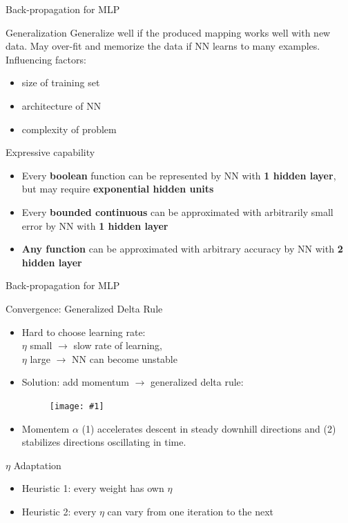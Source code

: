 \documentclass[9pt,t]{beamer}
\newcommand{\picEqHereWidth}[2] { %
    \begin{figure}[htp] 
        \centering
        \texttt{[image: \#1]}
    \end{figure}
}
\begin{document}
\begin{frame}{Back-propagation for MLP}
    \begin{alertblock}{Generalization}
        Generalize well if the produced mapping works well with new data. May over-fit and memorize the data if NN learns to many examples. Influencing factors:
        \begin{itemize}
            \item size of training set
            \item architecture of NN
            \item complexity of problem
        \end{itemize}
    \end{alertblock}
    \begin{alertblock}{Expressive capability}
        \begin{itemize}
            \item Every \textbf{boolean} function can be represented by NN with \textbf{1 hidden layer}, but may require \textbf{exponential hidden units}
            \item Every \textbf{bounded continuous} can be approximated with arbitrarily small error by NN with \textbf{1 hidden layer}
            \item \textbf{Any function} can be approximated with arbitrary accuracy by NN with \textbf{2 hidden layer}
        \end{itemize}
    \end{alertblock}
\end{frame}

\begin{frame}{Back-propagation for MLP}
    \begin{alertblock}{Convergence: Generalized Delta Rule}
        \begin{itemize}
            \item Hard to choose learning rate:\\
                $ \eta $ small $ \rightarrow $ slow rate of learning,\\
                $ \eta $ large $ \rightarrow $ NN can become unstable
            \item Solution: add momentum $ \rightarrow $ generalized delta rule:
                \picEqHereWidth{mlp_generalized_delta}{0.5\linewidth}
            \item Momentem $ \alpha $ (1) accelerates descent in steady downhill directions and (2) stabilizes directions oscillating in time.
        \end{itemize}
    \end{alertblock}
    \begin{alertblock}{$ \eta $ Adaptation}
        \begin{itemize}
            \item Heuristic 1: every weight has own $ \eta $
            \item Heuristic 2: every $ \eta $ can vary from one iteration to the next
        \end{itemize}
    \end{alertblock}
\end{frame}
\end{document}
